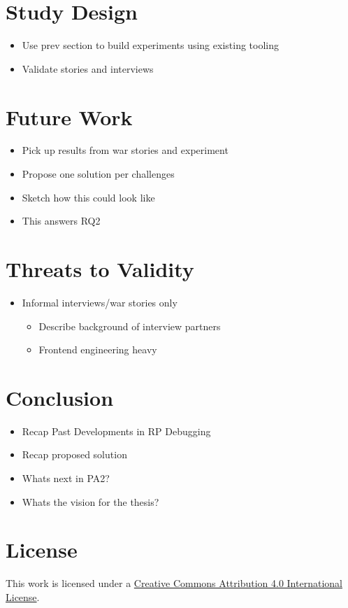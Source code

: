 \documentclass[12pt,a4paper]{article}
\begin{document}
\section{Study Design}
\begin{itemize}
	\item Use prev section to build experiments using existing tooling
	\item Validate stories and interviews
\end{itemize}

\section{Future Work}
\begin{itemize}
	\item Pick up results from war stories and experiment
	\item Propose one solution per challenges
	\item Sketch how this could look like
	\item This answers RQ2
\end{itemize}

\section{Threats to Validity}
\begin{itemize}
	\item Informal interviews/war stories only
	\begin{itemize}
		\item Describe background of interview partners
		\item Frontend engineering heavy
	\end{itemize}
\end{itemize}

\section{Conclusion}
\begin{itemize}
	\item Recap Past Developments in RP Debugging
	\item Recap proposed solution
	\item Whats next in PA2?
	\item Whats the vision for the thesis?
\end{itemize}







\section*{License}
\ccby\thinspace\thinspace This work is licensed under a \href{https://creativecommons.org/licenses/by/4.0/}{Creative Commons Attribution 4.0 International License}.
\end{document}
